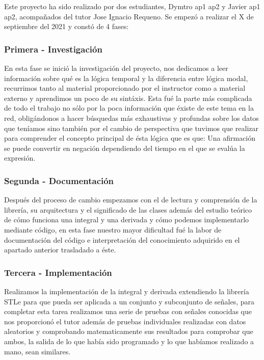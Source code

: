 Este proyecto ha sido realizado por dos estudiantes, Dymtro ap1 ap2 y Javier ap1 ap2, acompañados del tutor Jose Ignacio Requeno. Se empezó a realizar el X de septiembre del 2021 y constó de 4 fases: 

\subsubsection{Primera - Investigación}

	En esta fase se inició la investigación del proyecto, nos dedicamos a leer información sobre qué es la lógica temporal y la diferencia entre lógica modal, recurrimos tanto al material proporcionado por el instructor como a material externo y aprendimos un poco de su sintáxis. Esta fué la parte más complicada de todo el trabajo no sólo por la poca información que éxiste de este tema en la red, obligándonos a hacer búsquedas más exhaustivas y profundas sobre los datos que teníamos sino también por el cambio de perspectiva que tuvimos que realizar para comprender el concepto principal de ésta lógica que es que: Una afirmación se puede convertir en negación dependiendo del tiempo en el que se evalúa la expresión. 
	
\subsubsection{Segunda - Documentación}

	Después del proceso de cambio empezamos con el de lectura y comprensión de la librería, su arquitectura y el significado de las clases además del estudio teórico de cómo funciona una integral y una derivada y cómo podemos implementarlo mediante código, en esta fase nuestro mayor dificultad fué la labor de documentación del código e interpretación del conocimiento adquirido en el apartado anterior trasladado a éste. 

\subsubsection{Tercera - Implementación}
	
	Realizamos la implementación de la integral y derivada extendiendo la librería STLe para que pueda ser aplicada a un conjunto y subconjunto de señales, para completar esta tarea realizamos una serie de pruebas con señales conocidas que nos proporcionó el tutor además de pruebas individuales realizadas con datos aleatorios y comprobando matematicamente sus resultados para comprobar que ambos, la salida de lo que había sido programado y lo que habíamos realizado a mano, sean similares.

